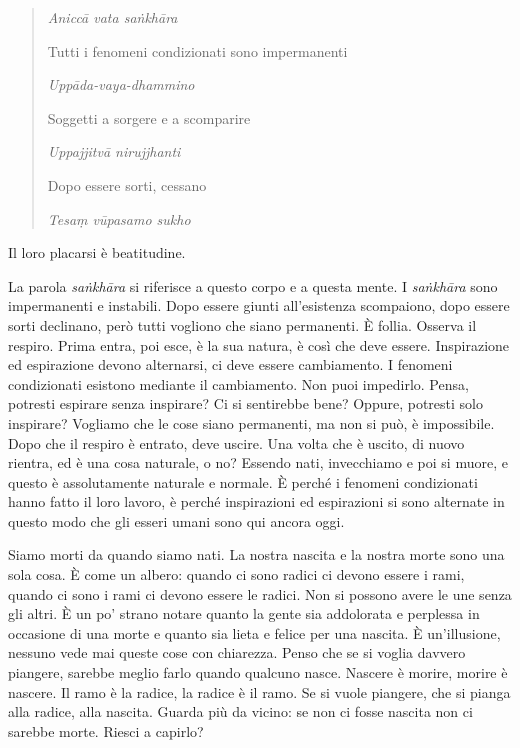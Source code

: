 \begin{quote}

\emph{Aniccā vata saṅkhāra}

Tutti i fenomeni condizionati sono impermanenti

\emph{Uppāda-vaya-dhammino}

Soggetti a sorgere e a scomparire

\emph{Uppajjitvā nirujjhanti}

Dopo essere sorti, cessano

\emph{Tesaṃ vūpasamo sukho}

\end{quote}

Il loro placarsi è beatitudine.

La parola \emph{saṅkhāra} si riferisce a questo corpo e a questa mente.
I \emph{saṅkhāra} sono impermanenti e instabili. Dopo essere giunti
all'esistenza scompaiono, dopo essere sorti declinano, però tutti
vogliono che siano permanenti. È follia. Osserva il respiro. Prima
entra, poi esce, è la sua natura, è così che deve essere. Inspirazione
ed espirazione devono alternarsi, ci deve essere cambiamento. I fenomeni
condizionati esistono mediante il cambiamento. Non puoi impedirlo.
Pensa, potresti espirare senza inspirare? Ci si sentirebbe bene? Oppure,
potresti solo inspirare? Vogliamo che le cose siano permanenti, ma non
si può, è impossibile. Dopo che il respiro è entrato, deve uscire. Una
volta che è uscito, di nuovo rientra, ed è una cosa naturale, o no?
Essendo nati, invecchiamo e poi si muore, e questo è assolutamente
naturale e normale. È perché i fenomeni condizionati hanno fatto il loro
lavoro, è perché inspirazioni ed espirazioni si sono alternate in questo
modo che gli esseri umani sono qui ancora oggi.

Siamo morti da quando siamo nati. La nostra nascita e la nostra morte
sono una sola cosa. È come un albero: quando ci sono radici ci devono
essere i rami, quando ci sono i rami ci devono essere le radici. Non si
possono avere le une senza gli altri. È un po' strano notare quanto la
gente sia addolorata e perplessa in occasione di una morte e quanto sia
lieta e felice per una nascita. È un'illusione, nessuno vede mai queste
cose con chiarezza. Penso che se si voglia davvero piangere, sarebbe
meglio farlo quando qualcuno nasce. Nascere è morire, morire è nascere.
Il ramo è la radice, la radice è il ramo. Se si vuole piangere, che si
pianga alla radice, alla nascita. Guarda più da vicino: se non ci fosse
nascita non ci sarebbe morte. Riesci a capirlo?

